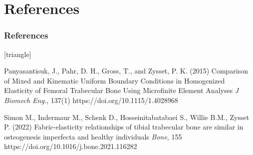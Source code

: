 \documentclass[xcolor=table,11pt]{beamer}
\begin{document}

	\section{References}

	\begin{frame}
		\frametitle{References}
		\footnotesize{
				\begin{thebibliography}{99}
						[triangle]
						
						 Panyasantisuk, J., Pahr, D. H., Gross, T., and Zysset, P. K. (2015)
						\newblock Comparison of Mixed and Kinematic Uniform Boundary Conditions in Homogenized Elasticity of Femoral Trabecular Bone Using Microfinite Element Analyses
						\newblock \textit{J Biomech Eng.}, 137(1)
						\newblock https://doi.org/10.1115/1.4028968

						Simon M., Indermaur M., Schenk D., Hosseinitabatabaei S., Willie B.M., Zysset P. (2022)
						\newblock Fabric-elasticity relationships of tibial trabecular bone are similar in osteogenesis imperfecta and healthy individuals
						\newblock \textit{Bone}, 155
						\newblock https://doi.org/10.1016/j.bone.2021.116282
						
					\end{thebibliography}
			}
	\end{frame}
	
\end{document}
